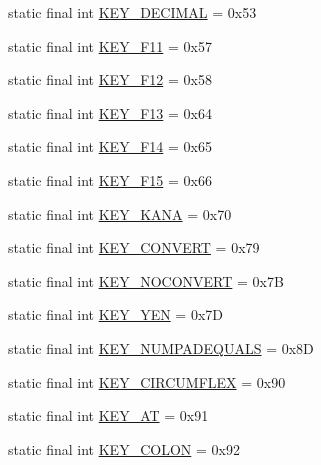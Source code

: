 \begin{DoxyCompactItemize}
\item 
static final int \mbox{\hyperlink{classorg_1_1newdawn_1_1slick_1_1_input_a506b45d0c82c10af0ece7e0a7e1f5162}{K\+E\+Y\+\_\+\+D\+E\+C\+I\+M\+AL}} = 0x53
\item 
static final int \mbox{\hyperlink{classorg_1_1newdawn_1_1slick_1_1_input_a67764380ad9795b676c10d3bc13b0e4e}{K\+E\+Y\+\_\+\+F11}} = 0x57
\item 
static final int \mbox{\hyperlink{classorg_1_1newdawn_1_1slick_1_1_input_a374eaf9e8689ebc8c62328455445fe7f}{K\+E\+Y\+\_\+\+F12}} = 0x58
\item 
static final int \mbox{\hyperlink{classorg_1_1newdawn_1_1slick_1_1_input_adcc4717fb438da3f2959f28053ea1690}{K\+E\+Y\+\_\+\+F13}} = 0x64
\item 
static final int \mbox{\hyperlink{classorg_1_1newdawn_1_1slick_1_1_input_a86fbfb6a92e976374a258e1678591b7c}{K\+E\+Y\+\_\+\+F14}} = 0x65
\item 
static final int \mbox{\hyperlink{classorg_1_1newdawn_1_1slick_1_1_input_ac83479612aaedb0eb062bdf9fd5930de}{K\+E\+Y\+\_\+\+F15}} = 0x66
\item 
static final int \mbox{\hyperlink{classorg_1_1newdawn_1_1slick_1_1_input_ac294d11447dd044334887740bbcf42ad}{K\+E\+Y\+\_\+\+K\+A\+NA}} = 0x70
\item 
static final int \mbox{\hyperlink{classorg_1_1newdawn_1_1slick_1_1_input_a5e3711d1d9dba2700f1bbfb3037fac67}{K\+E\+Y\+\_\+\+C\+O\+N\+V\+E\+RT}} = 0x79
\item 
static final int \mbox{\hyperlink{classorg_1_1newdawn_1_1slick_1_1_input_a40428e5f511fbb5b2036f744ecc4921d}{K\+E\+Y\+\_\+\+N\+O\+C\+O\+N\+V\+E\+RT}} = 0x7B
\item 
static final int \mbox{\hyperlink{classorg_1_1newdawn_1_1slick_1_1_input_adccf616e4f5ed6b3a630367f716c86b5}{K\+E\+Y\+\_\+\+Y\+EN}} = 0x7D
\item 
static final int \mbox{\hyperlink{classorg_1_1newdawn_1_1slick_1_1_input_afc4b0ba1514d2485d1f922d7c8ab2369}{K\+E\+Y\+\_\+\+N\+U\+M\+P\+A\+D\+E\+Q\+U\+A\+LS}} = 0x8D
\item 
static final int \mbox{\hyperlink{classorg_1_1newdawn_1_1slick_1_1_input_a7a375a32ac4d0784c821894f92941867}{K\+E\+Y\+\_\+\+C\+I\+R\+C\+U\+M\+F\+L\+EX}} = 0x90
\item 
static final int \mbox{\hyperlink{classorg_1_1newdawn_1_1slick_1_1_input_a3841b89eecd18d5592ffaf102db5c5f2}{K\+E\+Y\+\_\+\+AT}} = 0x91
\item 
static final int \mbox{\hyperlink{classorg_1_1newdawn_1_1slick_1_1_input_af9eb052dcd3441f7503a525479f62d90}{K\+E\+Y\+\_\+\+C\+O\+L\+ON}} = 0x92

\end{DoxyCompactItemize}
